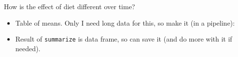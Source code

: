 \documentclass[ignorenonframetext,]{beamer}
\newenvironment{Shaded}{\begin{snugshade}}{\end{snugshade}}
\newcommand{\DataTypeTok}[1]{\textcolor[rgb]{0.13,0.29,0.53}{#1}}
\newcommand{\KeywordTok}[1]{\textcolor[rgb]{0.13,0.29,0.53}{\textbf{#1}}}
\newcommand{\NormalTok}[1]{#1}
\newcommand{\OperatorTok}[1]{\textcolor[rgb]{0.81,0.36,0.00}{\textbf{#1}}}
\newcommand{\StringTok}[1]{\textcolor[rgb]{0.31,0.60,0.02}{#1}}
\providecommand{\tightlist}{%
  \setlength{\itemsep}{0pt}\setlength{\parskip}{0pt}}
\begin{document}
\begin{frame}[fragile]{How is the effect of diet different over time?}
\protect\hypertarget{how-is-the-effect-of-diet-different-over-time}{}

\begin{itemize}
\tightlist
\item
  Table of means. Only I need long data for this, so make it (in a
  pipeline):
\end{itemize}

\begin{Shaded}
\end{Shaded}

\begin{itemize}
\tightlist
\item
  Result of \texttt{summarize} is data frame, so can save it (and do
  more with it if needed).
\end{itemize}

\end{frame}
\end{document}
